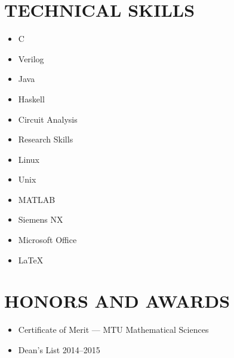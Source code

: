 \documentclass[letterpaper]{res}
\begin{document}
\begin{resume}
\section{TECHNICAL SKILLS}
	\vspace{-1pt}
	\begin{multicols}{4}
	\begin{itemize} \itemsep1pt \parskip0pt 
		\item C
		\item Verilog
		\item Java
		\item Haskell
		\item Circuit Analysis
		\item Research Skills
		\item Linux
		\item Unix
		\item MATLAB
		\item Siemens NX
		\item Microsoft Office
		\item LaTeX
	\end{itemize}
	\end{multicols}

\section{HONORS AND AWARDS}
	\begin{itemize}
		\item Certificate of Merit --- MTU Mathematical Sciences
		\item Dean's List 2014--2015
	\end{itemize}

\end{resume}
\end{document}
